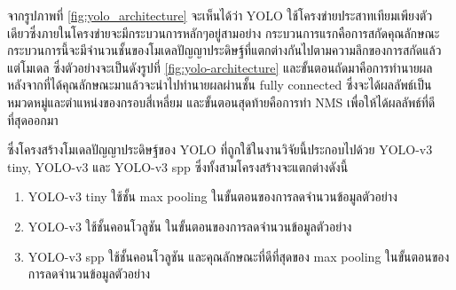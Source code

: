 จากรูปภาพที่ \ref{fig:yolo_architecture} จะเห็นได้ว่า YOLO ใช้โครงข่ายประสาทเทียมเพียงตัวเดียวซึ่งภายในโครงข่ายจะมีกระบวนการหลักๆอยู่สามอย่าง 
กระบวนการแรกคือการสกัดคุณลักษณะ กระบวนการนี้จะมีจำนวนชั้นของโมเดลปัญญาประดิษฐ์ที่แตกต่างกันไปตามความลึกของการสกัดแล้วแต่โมเดล ซึ่งตัวอย่างจะเป็นดังรูปที่ \ref{fig:yolo-architecture} 
และขั้นตอนถัดมาคือการทำนายผล หลังจากที่ได้คุณลักษณะมาแล้วจะนำไปทำนายผลผ่านชั้น fully connected ซึ่งจะได้ผลลัพธ์เป็นหมวดหมู่และตำแหน่งของกรอบสี่เหลี่ยม 
และขั้นตอนสุดท้ายคือการทำ NMS เพื่อให้ได้ผลลัพธ์ที่ดีที่สุดออกมา
\clearpage
\par ซึ่งโครงสร้างโมเดลปัญญาประดิษฐ์ของ YOLO ที่ถูกใช้ในงานวิจัยนี้ประกอบไปด้วย YOLO-v3 tiny, YOLO-v3 และ YOLO-v3 spp ซึ่งทั้งสามโครงสร้างจะแตกต่างดังนี้
\begin{enumerate}
	\setlength\itemsep{-0.25em}
	\item YOLO-v3 tiny ใช้ชั้น max pooling ในขั้นตอนของการลดจำนวนข้อมูลตัวอย่าง
	\item YOLO-v3 ใช้ชั้นคอนโวลูชัน ในขั้นตอนของการลดจำนวนข้อมูลตัวอย่าง
	\item YOLO-v3 spp ใช้ชั้นคอนโวลูชัน และคุณลักษณะที่ดีที่สุดของ max pooling ในขั้นตอนของการลดจำนวนข้อมูลตัวอย่าง
\end{enumerate}


